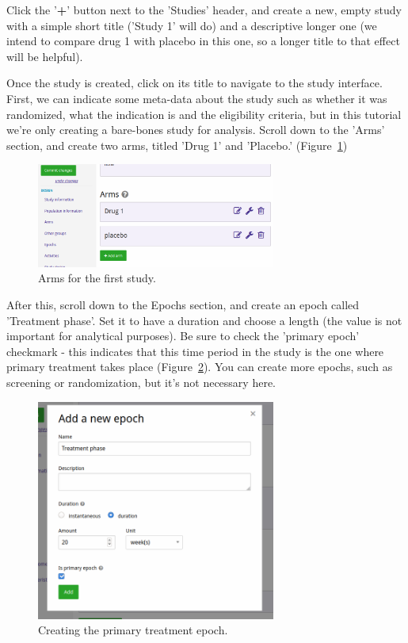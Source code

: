 \documentclass[12pt]{article}
\begin{document}
Click the '\textbf{+}' button next to the 'Studies' header, and create a new, empty study with a simple short title ('Study 1' will do) and a descriptive longer one (we intend to compare drug 1 with placebo in this one, so a longer title to that effect will be helpful).

Once the study is created, click on its title to navigate to the study interface.
First, we can indicate some meta-data about the study such as whether it was randomized, what the indication is and the eligibility criteria, but in this tutorial we're only creating a bare-bones study for analysis.
Scroll down to the 'Arms' section, and create two arms, titled 'Drug 1' and 'Placebo.' (Figure~\ref{fig:arms})

\begin{figure}[!ht]
  \centering
  \includegraphics[width=0.7\textwidth]{img/arms.png}
  \caption{Arms for the first study.}
\label{fig:arms}
\end{figure}

After this, scroll down to the Epochs section, and create an epoch called 'Treatment phase'.
Set it to have a duration and choose a length (the value is not important for analytical purposes).
Be sure to check the 'primary epoch' checkmark - this indicates that this time period in the study is the one where primary treatment takes place (Figure~\ref{fig:createMainPhase}).
You can create more epochs, such as screening or randomization, but it's not necessary here.

\begin{figure}[!ht]
  \centering
  \includegraphics[width=0.7\textwidth]{img/createMainPhase.png}
  \caption{Creating the primary treatment epoch.}
\label{fig:createMainPhase}
\end{figure}
\end{document}
